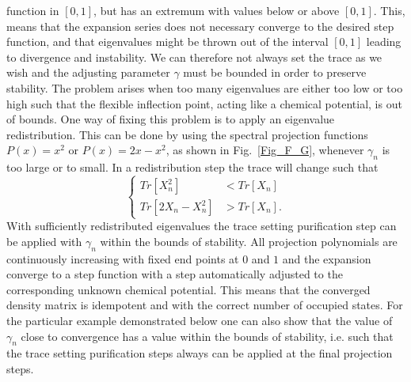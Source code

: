 function in $[0,1]$, but has an extremum with values below or above $[0,1]$.
This, means that the expansion series does not necessary converge
to the desired step function, and that eigenvalues might be thrown out
of the interval $[0,1]$ leading to divergence and instability.
We can therefore not always set the trace as we wish and
the adjusting parameter $\gamma$ must be bounded in order to preserve
stability. The problem arises when too many eigenvalues are
either too low or too high such that the flexible inflection
point, acting like a chemical potential, is out of bounds.
One way of fixing this problem is to apply an eigenvalue
redistribution. This can be done by using the spectral
projection functions  $P(x) = x^2$
or $P(x) = 2x-x^2$, as shown in Fig.\ \ref{Fig_F_G}, whenever $\gamma_n$ is 
too large or to small. In a redistribution step the trace will change 
such that
\begin{equation}
\left \{ \begin{array}{ll}
Tr[X_n^2] & < Tr[X_n]\\
Tr[2X_n-X_n^2] & > Tr[X_n].
\end{array} \right.
\end{equation}
With sufficiently
redistributed eigenvalues the trace setting purification
step can be applied with $\gamma_n$ within
the bounds of stability. All projection
polynomials are continuously increasing with fixed end
points at $0$ and $1$ and the expansion converge
to a step function with a step automatically adjusted to
the corresponding unknown chemical potential. This means
that the converged density matrix is idempotent and with
the correct number of occupied states. For the particular
example demonstrated below one can also show that the
value of $\gamma_n$ close to convergence has a value within
the bounds of stability, i.e. such that the trace setting
purification steps always can be applied at the final projection steps.

